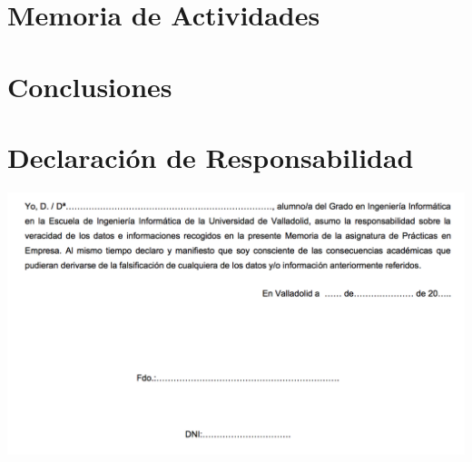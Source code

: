 \documentclass[10pt, a4paper,spanish]{article}
\begin{document}
    \section{Memoria de Actividades}



    \section{Conclusiones}



    \newpage
    \section{Declaración de Responsabilidad}

        \includegraphics[width=\textwidth]{res/responsibility-declaration}
\end{document}
